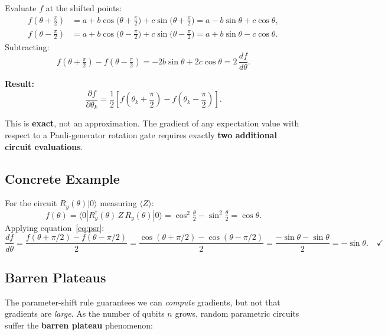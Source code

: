\documentclass[a4paper,11pt]{article}
\newcommand{\ket}[1]{|#1\rangle}
\newcommand{\bra}[1]{\langle#1|}
\begin{document}
\begin{mathbox}
Evaluate $f$ at the shifted points:
\begin{align}
    f\!\left(\theta + \tfrac\pi2\right) &= a
        + b\cos\!\bigl(\theta+\tfrac\pi2\bigr)
        + c\sin\!\bigl(\theta+\tfrac\pi2\bigr)
        = a - b\sin\theta + c\cos\theta, \\
    f\!\left(\theta - \tfrac\pi2\right) &= a
        + b\cos\!\bigl(\theta-\tfrac\pi2\bigr)
        + c\sin\!\bigl(\theta-\tfrac\pi2\bigr)
        = a + b\sin\theta - c\cos\theta.
\end{align}
Subtracting:
\begin{equation}
    f\!\left(\theta+\tfrac\pi2\right) - f\!\left(\theta-\tfrac\pi2\right)
    = -2b\sin\theta + 2c\cos\theta = 2\,\frac{df}{d\theta}.
\end{equation}

\textbf{Result:}
\begin{equation}
    \boxed{\frac{\partial f}{\partial\theta_k}
    = \frac{1}{2}\left[f\!\left(\theta_k + \frac\pi2\right)
    - f\!\left(\theta_k - \frac\pi2\right)\right].}
    \label{eq:psr}
\end{equation}

This is \textbf{exact}, not an approximation. The gradient of any
expectation value with respect to a Pauli-generator rotation gate
requires exactly \textbf{two additional circuit evaluations}.
\end{mathbox}

\subsection{Concrete Example}

For the circuit $R_y(\theta)\ket{0}$ measuring $\langle Z\rangle$:
\[
    f(\theta) = \bra{0}R_y^\dagger(\theta)\,Z\,R_y(\theta)\ket{0}
    = \cos^2\!\tfrac\theta2 - \sin^2\!\tfrac\theta2 = \cos\theta.
\]
Applying equation~\eqref{eq:psr}:
\[
    \frac{df}{d\theta}
    = \frac{f(\theta+\pi/2) - f(\theta-\pi/2)}{2}
    = \frac{\cos(\theta+\pi/2) - \cos(\theta-\pi/2)}{2}
    = \frac{-\sin\theta - \sin\theta}{2} = -\sin\theta. \quad\checkmark
\]

\subsection{Barren Plateaus}

The parameter-shift rule guarantees we can \emph{compute} gradients, but not
that gradients are \emph{large}. As the number of qubits $n$ grows, random
parametric circuits suffer the \textbf{barren plateau} phenomenon:
\end{document}
